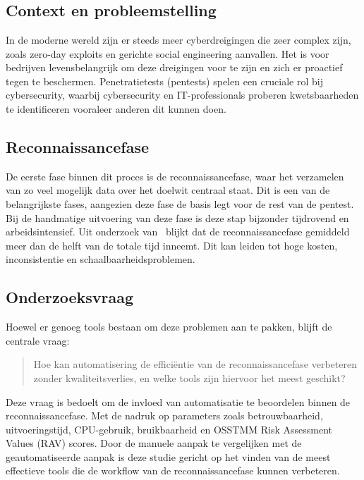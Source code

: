 
\chapter{}%
\label{ch:inleiding}

\section{Context en probleemstelling}
In de moderne wereld zijn er steeds meer cyberdreigingen die zeer complex zijn, zoals zero-day exploits en gerichte social engineering aanvallen. 
Het is voor bedrijven levensbelangrijk om deze dreigingen voor te zijn en zich er proactief tegen te beschermen. 
Penetratietests (pentests) spelen een cruciale rol bij cybersecurity, waarbij cybersecurity en IT-professionals proberen kwetsbaarheden te identificeren vooraleer anderen dit kunnen doen.

\section{Reconnaissancefase}
De eerste fase binnen dit proces is de reconnaissancefase, waar het verzamelen van zo veel mogelijk data over het doelwit centraal staat. 
Dit is een van de belangrijkste fases, aangezien deze fase de basis legt voor de rest van de pentest. 
Bij de handmatige uitvoering van deze fase is deze stap bijzonder tijdrovend en arbeidsintensief. 
Uit onderzoek van~\textcite{DBLP} blijkt dat de reconnaissancefase gemiddeld meer dan de helft van de totale tijd inneemt. 
Dit kan leiden tot hoge kosten, inconsistentie en schaalbaarheidsproblemen.

\section{Onderzoeksvraag}
Hoewel er genoeg tools bestaan om deze problemen aan te pakken, blijft de centrale vraag:
\begin{quote}
    Hoe kan automatisering de efficiëntie van de reconnaissancefase verbeteren zonder kwaliteitsverlies, en welke tools zijn hiervoor het meest geschikt?
\end{quote}

\newpage

Deze vraag is bedoelt om de invloed van automatisatie te beoordelen binnen de reconnaissancefase.
Met de nadruk op parameters zoals betrouwbaarheid, uitvoeringstijd, CPU-gebruik, bruikbaarheid en OSSTMM Risk Assessment Values (RAV) scores.
Door de manuele aanpak te vergelijken met de geautomatiseerde aanpak is deze studie gericht op het vinden van de meest effectieve tools die de workflow van de reconnaissancefase kunnen verbeteren.

